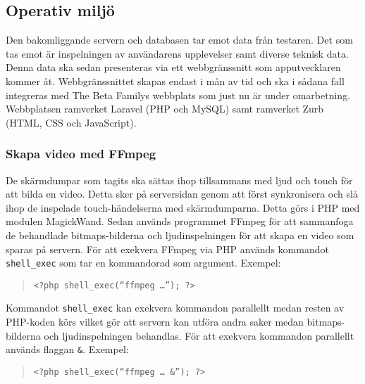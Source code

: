 \subsection{Operativ miljö}
Den bakomliggande servern och databasen tar emot data från testaren. Det som tas emot är inspelningen av användarens upplevelser samt diverse teknisk data. Denna data ska sedan presenteras via ett webbgränssnitt som apputvecklaren kommer åt. Webbgränssnittet skapas endast i mån av tid och ska i sådana fall integreras med The Beta Familys webbplats som just nu är under omarbetning. Webbplatsen ramverket Laravel (PHP och MySQL) samt ramverket Zurb (HTML, CSS och JavaScript).

\subsubsection{Skapa video med FFmpeg}
De skärmdumpar som tagits ska sättas ihop tillsammans med ljud och touch för att bilda en video. Detta sker på serversidan genom att först synkronisera och slå ihop de inspelade touch-händelserna med skärmdumparna. Detta görs i PHP med modulen MagickWand\parencite{magickwand}. Sedan används programmet FFmpeg\parencite{ffmpeg} för att sammanfoga de behandlade bitmaps-bilderna och ljudinspelningen för att skapa en video som sparas på servern. För att exekvera FFmpeg via PHP används kommandot \texttt{shell\_exec}\parencite{shellexec} som tar en kommandorad som argument. Exempel:
\begin{quote}
\texttt{<?php shell\_exec(``ffmpeg \dots''); ?>}
\end{quote}
Kommandot \texttt{shell\_exec} kan exekvera kommandon parallellt medan resten av PHP-koden körs vilket gör att servern kan utföra andra saker medan bitmaps-bilderna och ljudinspelningen behandlas. För att exekvera kommandon parallellt används flaggan \texttt{\&}. Exempel:
\begin{quote}
\texttt{<?php shell\_exec(``ffmpeg \dots~\textbf{\&}''); ?>}
\end{quote}
